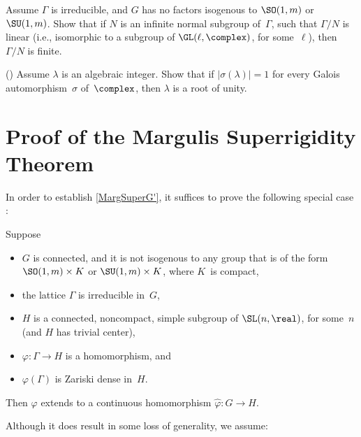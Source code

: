 \begin{exercises}
\item 
Assume $\Gamma$ is irreducible, and $G$ has no factors isogenous to $\SO(1,m)$ or $\SU(1,m)$.
Show that if $N$ is an infinite normal subgroup of~$\Gamma$, such that $\Gamma/N$ is linear (i.e., isomorphic to a subgroup of $\GL(\ell,\complex)$, for some~$\ell$), then $\Gamma/N$ is finite.  


\item \label{KroneckerNot1}
(\emph{})
Assume $\lambda$ is an algebraic integer. Show that if $|\sigma(\lambda)| = 1$ for every Galois automorphism~$\sigma$ of~$\complex$, then $\lambda$ is a root of unity.

\end{exercises}



\section{Proof of the Margulis Superrigidity Theorem} \label{SuperPfSect}

In order to establish \cref{MargSuperG'}, it suffices to prove the following special case :

\begin{thm} \label{MargSuperHSimple}
Suppose
\noprelistbreak
\begin{itemize}
\item $G$ is connected, and it is not isogenous to any group that is of the form\/ $\SO(1,m) \times K$ or\/ $\SU(1,m) \times K$, where $K$~is compact, 
\item the lattice $\Gamma$ is irreducible in~$G$,
\item $H$ is a connected, noncompact, simple subgroup of\/ $\SL(n,\real)$, for some~$n$ {\rm(}and $H$ has trivial center{\rm)},
\item $\varphi \colon \Gamma \to H$ is a homomorphism,
and
\item $\varphi(\Gamma)$ is Zariski dense in~$H$.
\end{itemize}
Then $\varphi$ extends to a continuous homomorphism $\widehat\varphi \colon G \to H$.
\end{thm}

Although it does result in some loss of generality, we assume:

